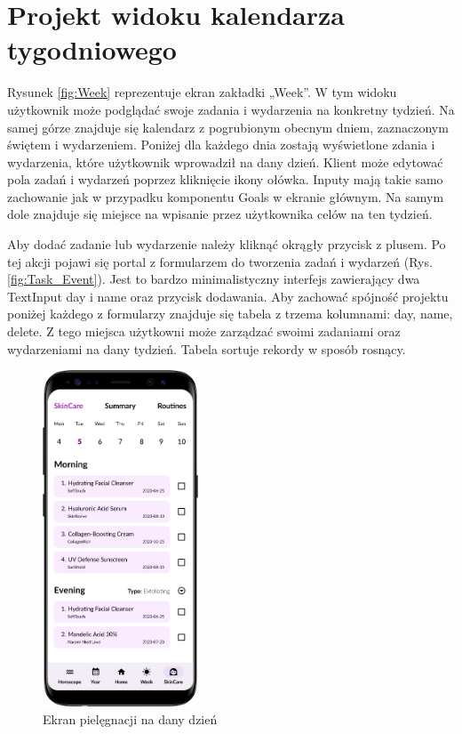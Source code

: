 \section{Projekt widoku kalendarza tygodniowego}
Rysunek \ref{fig:Week} reprezentuje ekran zakładki „Week”. W tym widoku  użytkownik może podglądać swoje zadania i wydarzenia na konkretny tydzień. Na samej górze znajduje się kalendarz z pogrubionym obecnym dniem, zaznaczonym świętem i wydarzeniem. Poniżej dla każdego dnia zostają wyświetlone zdania i wydarzenia, które użytkownik wprowadził na dany dzień. Klient może edytować pola zadań i wydarzeń poprzez kliknięcie ikony ołówka. Inputy mają takie samo zachowanie jak w przypadku komponentu Goals w ekranie głównym. Na samym dole znajduje się miejsce na wpisanie przez użytkownika celów na ten tydzień.

Aby dodać zadanie lub wydarzenie należy kliknąć okrągły przycisk z plusem. Po tej akcji pojawi się portal z formularzem do tworzenia zadań i wydarzeń (Rys. \ref{fig:Task_Event}). Jest to bardzo minimalistyczny interfejs zawierający dwa TextInput day i name oraz przycisk dodawania. Aby zachować spójność projektu poniżej każdego z formularzy znajduje się tabela z trzema kolumnami: day, name, delete. Z tego miejsca użytkowni może zarządzać swoimi zadaniami oraz wydarzeniami na dany tydzień. Tabela sortuje rekordy w sposób rosnący.

\begin{figure}[t]
	\begin{center}
		\begin{minipage}{0.4\textwidth}
			\centering
			\includegraphics[height=10cm, keepaspectratio]{images/interfejs_figma/SkinCare}
			\caption{Ekran pielęgnacji na dany dzień}
			\label{fig:SkinCare}
		\end{minipage}
	\end{center}
\end{figure}

